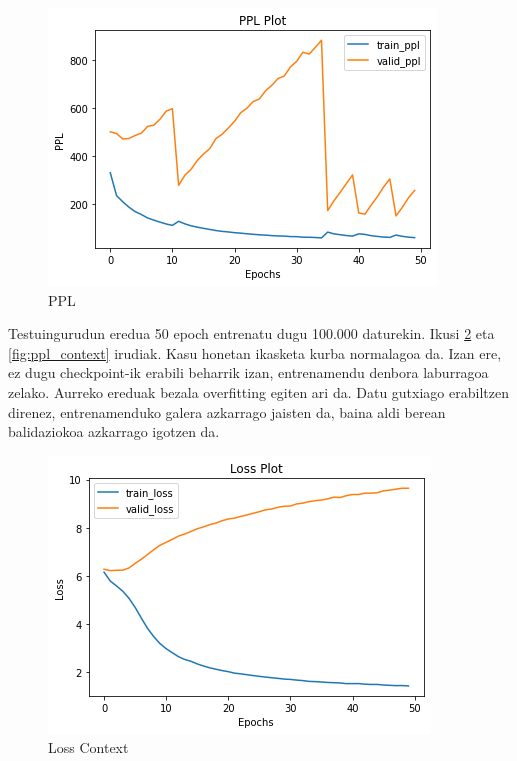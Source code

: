 \documentclass[11pt,a4paper]{article}
\begin{document}
\begin{figure}[ht]
    \centering
    \includegraphics[width=\linewidth]{ppl}
    \caption{PPL}
    \label{fig:ppl}
\end{figure}

Testuingurudun eredua 50 epoch entrenatu dugu 100.000 daturekin. Ikusi \ref{fig:loss_context} eta \ref{fig:ppl_context} irudiak. Kasu honetan ikasketa kurba normalagoa da. Izan ere, ez dugu checkpoint-ik erabili beharrik izan, entrenamendu denbora laburragoa zelako. Aurreko ereduak bezala overfitting egiten ari da. Datu gutxiago erabiltzen direnez, entrenamenduko galera azkarrago jaisten da, baina aldi berean balidaziokoa azkarrago igotzen da.

\begin{figure}[ht]
    \centering
    \includegraphics[width=\linewidth]{loss_context}
    \caption{Loss Context}
    \label{fig:loss_context}
\end{figure}
\end{document}
